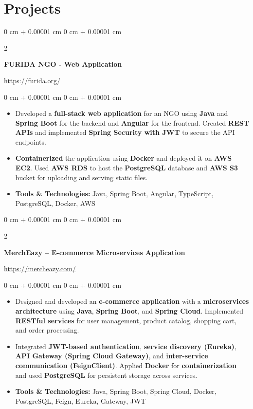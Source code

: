 \documentclass[10pt, letterpaper]{article}
\newenvironment{highlights}{
    \begin{itemize}[
        topsep=0.10 cm,
        parsep=0.10 cm,
        partopsep=0pt,
        itemsep=0pt,
        leftmargin=0 cm + 10pt
    ]
}{
    \end{itemize}
} %
\newenvironment{onecolentry}{
    \begin{adjustwidth}{
        0 cm + 0.00001 cm
    }{
        0 cm + 0.00001 cm
    }
}{
    \end{adjustwidth}
} %
\newenvironment{twocolentry}[2][]{
    \onecolentry
    \def\secondColumn{#2}
    \setcolumnwidth{\fill, 4.5 cm}
    \begin{paracol}{2}
}{
    \switchcolumn \raggedleft \secondColumn
    \end{paracol}
    \endonecolentry
} %
\begin{document}
    
    \section{Projects}



        
\begin{twocolentry}{
    \href{https://furida.org/}{https://furida.org/}
}
    \textbf{FURIDA NGO - Web Application}
\end{twocolentry}

\vspace{0.10 cm}
\begin{onecolentry}
    \begin{highlights}
        \item Developed a \textbf{full-stack web application} for an NGO using \textbf{Java} and \textbf{Spring Boot} for the backend and \textbf{Angular} for the frontend. Created \textbf{REST APIs} and implemented \textbf{Spring Security with JWT} to secure the API endpoints. 
        \item \textbf{Containerized} the application using \textbf{Docker} and deployed it on \textbf{AWS EC2}. Used \textbf{AWS RDS} to host the \textbf{PostgreSQL} database and \textbf{AWS S3} bucket for uploading and serving static files.
        \item \textbf{Tools \& Technologies:} Java, Spring Boot, Angular, TypeScript, PostgreSQL, Docker, AWS
    \end{highlights}
\end{onecolentry}

\vspace{0.2 cm}

\begin{twocolentry}{
    \href{https://mercheazy.com/}{https://mercheazy.com/}
}
    \textbf{MerchEazy – E-commerce Microservices Application}
\end{twocolentry}

\vspace{0.10 cm}
\begin{onecolentry}
    \begin{highlights}
        \item Designed and developed an \textbf{e-commerce application} with a \textbf{microservices architecture} using \textbf{Java}, \textbf{Spring Boot}, and \textbf{Spring Cloud}. Implemented \textbf{RESTful services} for user management, product catalog, shopping cart, and order processing. 
        \item Integrated \textbf{JWT-based authentication}, \textbf{service discovery (Eureka)}, \textbf{API Gateway (Spring Cloud Gateway)}, and \textbf{inter-service communication (FeignClient)}. Applied \textbf{Docker} for \textbf{containerization} and used \textbf{PostgreSQL} for persistent storage across services.
        \item \textbf{Tools \& Technologies:} Java, Spring Boot, Spring Cloud, Docker, PostgreSQL, Feign, Eureka, Gateway, JWT
    \end{highlights}
\end{onecolentry}
\end{document}
